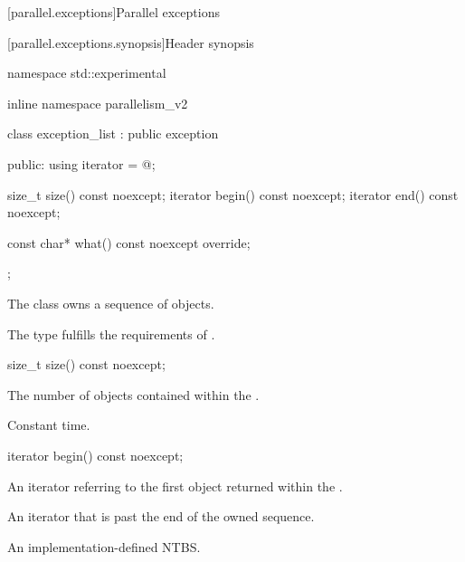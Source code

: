 
[parallel.exceptions]{Parallel exceptions}

[parallel.exceptions.synopsis]{Header  synopsis}

\begin{codeblock}
namespace std::experimental {
inline namespace parallelism_v2 {

  class exception_list : public exception {
  public:
    using iterator = @\unspec@;

    size_t size() const noexcept;
    iterator begin() const noexcept;
    iterator end() const noexcept;

    const char* what() const noexcept override;
  };
}
}
\end{codeblock}

\pnum
The class  owns a sequence of  objects.

\pnum
The type  fulfills the requirements of .

\begin{itemdecl}
size_t size() const noexcept;
\end{itemdecl}

\begin{itemdescr}
  \pnum
  \returns The number of  objects contained within the .

  \pnum
  \complexity Constant time.
\end{itemdescr}

\begin{itemdecl}
iterator begin() const noexcept;
\end{itemdecl}

\begin{itemdescr}
  \pnum
  \returns An iterator referring to the first  object returned within the .
\end{itemdescr}

\begin{itemdescr}
  \pnum
  \returns An iterator that is past the end of the owned sequence.
\end{itemdescr}

\begin{itemdescr}
  \pnum
  \returns An implementation-defined NTBS.
\end{itemdescr}

